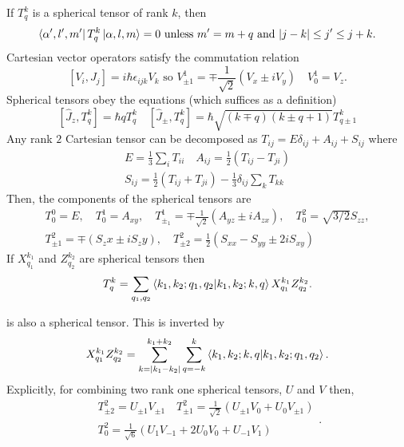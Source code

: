 \documentclass{article}
\begin{document}
    If $T_q^k$ is a spherical tensor of rank  $k$, then 
     \[
    \bra{\alpha',l',m'} T_q^k \ket{\alpha, l, m} = 0 
    \text{ unless } m' = m + q \text{ and } |j-k| \leq j' \leq j+k
    .\] 
    Cartesian vector operators satisfy the commutation relation
    \[
      [V_i, J_j] = i \hbar \epsilon_{ijk} V_k \text{ so }
      V^1_{\pm 1} = \mp \frac{1}{\sqrt 2} (V_x \pm i V_y) \quad V_0^1 = V_z
    .\] 
    Spherical tensors obey the equations (which suffices as a definition)
    \[
      [\hat{J}_z , T_q^k] = \hbar q T_q^k \quad 
      [\hat{J}_\pm , T_q^k ] = \hbar \sqrt{(k\mp q)(k\pm q + 1)}T_{q\pm 1}^k
    \] 
    Any rank $2$ Cartesian tensor can be decomposed as 
    $T_{ij} = E \delta_{ij} + A_{ij} + S_{ij} $ where  \[
    \begin{split}
      E = \frac{1}{3} \sum_i T_{ii} \quad A_{ij} = \frac{1}{2}(T_{ij} - T_{ji}) \\
      S_{ij} = \frac{1}{2}(T_{ij} + T_{ji}) - \frac{1}{3} \delta_{ij} \sum_k T_{kk} 
    \end{split}
    \] 
    Then, the components of the spherical tensors are 
    \[
      \begin{split}
      T_0^0 = E ,\quad T_0^1 = A_{xy} ,\quad 
      T_{\pm_1}^1 = \mp \frac{1}{\sqrt 2} (A_{yz} \pm i A_{zx}) ,\quad
      T_0^2 = \sqrt{3/2} S_{zz}, \\
      T_{\pm 1}^2 = \mp (S_zx \pm i S_zy) ,\quad 
      T_{\pm 2}^2 = \frac{1}{2}(S_{xx} - S_{yy} \pm 2 i S_{xy})
      \end{split}
    \] 
    If $X_{q_1}^{k_1}$ and $Z_{q_2}^{k_2}$ are spherical tensors then 
    \[
      T_q^k = \sum_{q_1, q_2} \bra{k_1,k_2;q_1,q_2}\ket{k_1,k_2;k,q}X^{k_1}_{q_1}Z_{q_2}^{k_2}
    .\] 
    
    is also a spherical tensor. This is inverted by 
    \[
      X_{q_1}^{k_1}Z_{q_2}^{k_2} = \sum_{k=|k_1-k_2|}^{k_1+k_2} \sum_{q = -k}^k
      \bra{k_1,k_2;k,q}\ket{k_1,k_2;q_1,q_2}
    .\] 
    Explicitly, for combining two rank one spherical tensors, $U$ and  $V$ then,
     \[
    \begin{split}
      T^2_{\pm 2} = U_{\pm 1} V_{\pm 1} \quad T^2_{\pm 1} = \frac{1}{\sqrt 2}
      (U_{\pm 1}V_0  + U_0 V_{\pm 1}) \\
      T^2_0 = \frac{1}{\sqrt 6 } (U_1 V_{-1} + 2 U_0 V_0 + U_{-1}V_1)
    \end{split}
    .\] 
\end{document}
